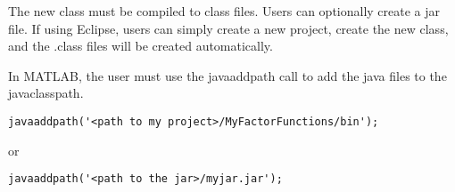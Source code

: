 
The new class must be compiled to class files. Users can optionally create a jar file. If using Eclipse, users can simply create a new project, create the new class, and the .class files will be created automatically.


In MATLAB, the user must use the javaaddpath call to add the java files to the javaclasspath.

\begin{lstlisting}
javaaddpath('<path to my project>/MyFactorFunctions/bin');
\end{lstlisting}

or

\begin{lstlisting}
javaaddpath('<path to the jar>/myjar.jar');
\end{lstlisting}

